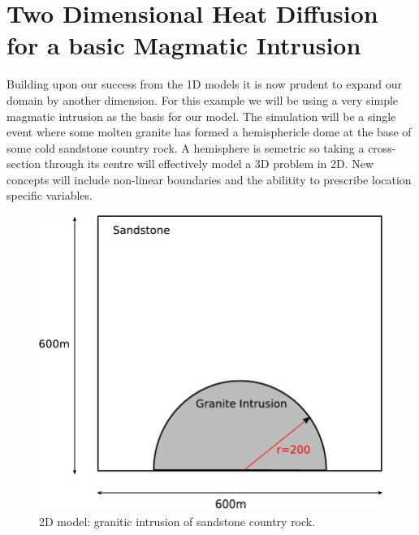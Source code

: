 
%
%
%

\section{Two Dimensional Heat Diffusion for a basic Magmatic Intrusion}
 Building upon our success from the 1D models it is now prudent to expand our domain by another dimension. For this example we will be using a very simple magmatic intrusion as the basis for our model. The simulation will be a single event where some molten granite has formed a hemisphericle dome at the base of some cold sandstone country rock. A hemisphere is semetric so taking a cross-section through its centre will effectively model a 3D problem in 2D. New concepts will include non-linear boundaries and the abilitity to prescribe location specific variables.

\begin{figure}[h!]
\centerline{\includegraphics[width=4.in]{figures/twodheatdiff}}
\caption{2D model: granitic intrusion of sandstone country rock.}
\label{fig:twodhdmodel}
\end{figure}

